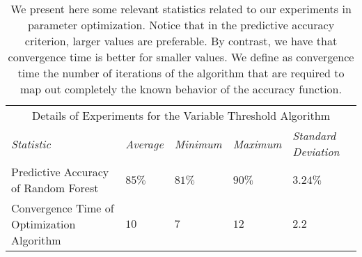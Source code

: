 \begin{table}[H]
    \centering
    \scriptsize
    \begin{tabular}{|p{3cm}|p{2cm}|p{2cm}|p{2cm}|p{2cm}|}
      \hline
      \hline
      \multicolumn{5}{c}{Details of Experiments for the Variable Threshold Algorithm}\\
      \cline{1-5}
      \emph{Statistic} & \emph{Average} & \emph{Minimum} & \emph{Maximum} & \emph{Standard Deviation}\\
      \hline
      Predictive Accuracy of Random Forest & {\vspace{0mm}$85\%$} & {\vspace{0mm}$81\%$} & {\vspace{0mm}$90\%$} & {\vspace{0mm}$3.24\%$}\\\hline
      Convergence Time of Optimization Algorithm & {\vspace{0mm}$10$} & {\vspace{0mm}$7$} & {\vspace{0mm}$12$} & {\vspace{0mm}$2.2$}\\\hline
    \end{tabular}
    \caption{\small We present here some relevant statistics related to our experiments in parameter optimization. Notice that in the predictive accuracy criterion, larger values are preferable. By contrast, we have that convergence time is better for smaller values. We define as convergence time the number of iterations of the algorithm that are required to map out completely the known behavior of the accuracy function.}
  \end{table}